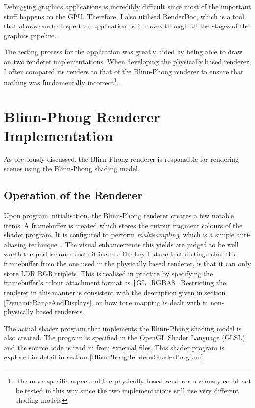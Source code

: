 Debugging graphics applications is incredibly difficult since most of the important stuff happens on the GPU. Therefore, I also utilised RenderDoc, which is a tool that allows one to inspect an application as it moves through all the stages of the graphics pipeline.

The testing process for the application was greatly aided by being able to draw on two renderer implementations. When developing the physically based renderer, I often compared its renders to that of the Blinn-Phong renderer to ensure that nothing was fundamentally incorrect\footnote{The more specific aspects of the physically based renderer obviously could not be tested in this way since the two implementations still use very different shading models}.

\section{Blinn-Phong Renderer Implementation} \label{BlinnPhongImplementation}

As previously discussed, the Blinn-Phong renderer is responsible for rendering scenes using the Blinn-Phong shading model.

\subsection{Operation of the Renderer}

Upon program initialisation, the Blinn-Phong renderer creates a few notable items. A framebuffer is created which stores the output fragment colours of the shader program. It is configured to perform \textit{multisampling}, which is a simple anti-aliasing technique~\cite{RealityEngine}. The visual enhancements this yields are judged to be well worth the performance costs it incurs. The key feature that distinguishes this framebuffer from the one used in the physically based renderer, is that it can only store LDR RGB triplets. This is realised in practice by specifying the framebuffer's colour attachment format as \texttt|GL_RGBA8|. Restricting the renderer in this manner is consistent with the description given in section \ref{DynamicRangeAndDisplays}, on how tone mapping is dealt with in non-physically based renderers.

The actual shader program that implements the Blinn-Phong shading model is also created. The program is specified in the OpenGL Shader Language (GLSL), and the source code is read in from external files. This shader program is explored in detail in section \ref{BlinnPhongRendererShaderProgram}.

